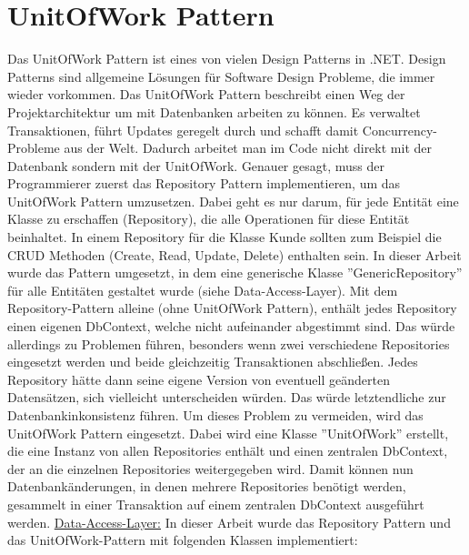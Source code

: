 \section{UnitOfWork Pattern}
Das UnitOfWork Pattern ist eines von vielen Design Patterns in .NET. Design Patterns sind allgemeine Lösungen für Software Design Probleme, die immer wieder vorkommen. Das UnitOfWork Pattern beschreibt einen Weg der Projektarchitektur um mit Datenbanken arbeiten zu können. Es verwaltet Transaktionen, führt Updates geregelt durch und schafft damit Concurrency-Probleme aus der Welt. Dadurch arbeitet man im Code nicht direkt mit der Datenbank sondern mit der UnitOfWork. \newline Genauer gesagt, muss der Programmierer zuerst das Repository Pattern implementieren, um das UnitOfWork Pattern umzusetzen. Dabei geht es nur darum, für jede Entität eine Klasse zu erschaffen (Repository), die alle Operationen für diese Entität beinhaltet. In einem Repository für die Klasse Kunde sollten zum Beispiel die CRUD Methoden (Create, Read, Update, Delete) enthalten sein. In dieser Arbeit wurde das Pattern umgesetzt, in dem eine generische Klasse ''GenericRepository'' für alle Entitäten gestaltet wurde (siehe Data-Access-Layer). 
\newline Mit dem Repository-Pattern alleine (ohne UnitOfWork Pattern), enthält jedes Repository einen eigenen DbContext, welche nicht aufeinander abgestimmt sind. Das würde allerdings zu Problemen führen, besonders wenn zwei verschiedene Repositories eingesetzt werden und beide gleichzeitig Transaktionen abschließen. Jedes Repository hätte dann seine eigene Version von eventuell geänderten Datensätzen, sich vielleicht unterscheiden würden. Das würde letztendliche zur Datenbankinkonsistenz führen.
\newline Um dieses Problem zu vermeiden, wird das UnitOfWork Pattern eingesetzt. Dabei wird eine Klasse ''UnitOfWork'' erstellt, die eine Instanz von allen Repositories enthält und einen zentralen DbContext, der an die einzelnen Repositories weitergegeben wird. Damit können nun Datenbankänderungen, in denen mehrere Repositories benötigt werden, gesammelt in 
einer Transaktion auf einem zentralen DbContext ausgeführt werden.
\newline
\newline
\underline{Data-Access-Layer:}
In dieser Arbeit wurde das Repository Pattern und das UnitOfWork-Pattern mit folgenden Klassen implementiert:
